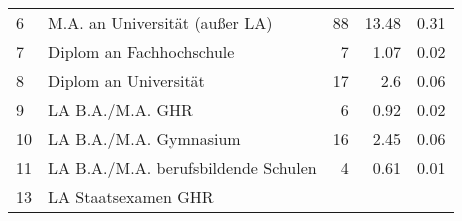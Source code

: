 \begin{longtable}{lXrrr}
     6 &
     \multicolumn{1}{X}{ M.A. an Universität (außer LA)   } &


       \num{88} &
       \num[round-mode=places,round-precision=2]{13.48} &
         \num[round-mode=places,round-precision=2]{0.31} \\

     7 &
     \multicolumn{1}{X}{ Diplom an Fachhochschule   } &


       \num{7} &
       \num[round-mode=places,round-precision=2]{1.07} &
         \num[round-mode=places,round-precision=2]{0.02} \\

     8 &
     \multicolumn{1}{X}{ Diplom an Universität   } &


       \num{17} &
       \num[round-mode=places,round-precision=2]{2.6} &
         \num[round-mode=places,round-precision=2]{0.06} \\

     9 &
     \multicolumn{1}{X}{ LA B.A./M.A. GHR   } &


       \num{6} &
       \num[round-mode=places,round-precision=2]{0.92} &
         \num[round-mode=places,round-precision=2]{0.02} \\

     10 &
     \multicolumn{1}{X}{ LA B.A./M.A. Gymnasium   } &


       \num{16} &
       \num[round-mode=places,round-precision=2]{2.45} &
         \num[round-mode=places,round-precision=2]{0.06} \\

     11 &
     \multicolumn{1}{X}{ LA B.A./M.A. berufsbildende Schulen   } &


       \num{4} &
       \num[round-mode=places,round-precision=2]{0.61} &
         \num[round-mode=places,round-precision=2]{0.01} \\

     13 &
     \multicolumn{1}{X}{ LA Staatsexamen GHR   } &



\end{longtable}
